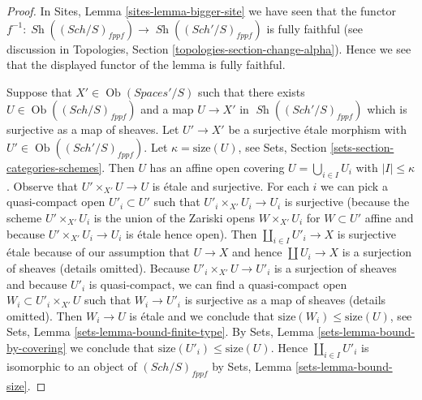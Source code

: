 \documentclass{stacks-project}
\theoremstyle{plain}
\theoremstyle{definition}
\theoremstyle{remark}
\numberwithin{equation}{subsection}
\def\Sch{\mathit{Sch}}
\def\Ob{\mathop{\mathrm{Ob}}\nolimits}
\def\Sh{\mathop{\mathit{Sh}}\nolimits}
\begin{document}
\begin{proof}
In Sites, Lemma \ref{sites-lemma-bigger-site} we have seen that the functor
$f^{-1} : \Sh((\Sch/S)_{fppf}) \to \Sh((\Sch'/S)_{fppf})$
is fully faithful (see discussion in
Topologies, Section \ref{topologies-section-change-alpha}).
Hence we see that the displayed functor of the lemma is fully faithful.

\medskip\noindent
Suppose that $X' \in \Ob(\textit{Spaces}'/S)$ such that there exists
$U \in \Ob((\Sch/S)_{fppf})$ and a map $U \to X'$ in
$\Sh((\Sch'/S)_{fppf})$ which is surjective as a map of sheaves.
Let $U' \to X'$ be a surjective \'etale morphism with
$U' \in \Ob((\Sch'/S)_{fppf})$. Let $\kappa = \text{size}(U)$, see
Sets, Section \ref{sets-section-categories-schemes}.
Then $U$ has an affine open covering $U = \bigcup_{i \in I} U_i$
with $|I| \leq \kappa$. Observe that $U' \times_{X'} U \to U$ is \'etale
and surjective. For each $i$ we can pick a quasi-compact
open $U'_i \subset U'$ such that $U'_i \times_{X'} U_i \to U_i$
is surjective (because the scheme $U' \times_{X'} U_i$ is the
union of the Zariski opens $W \times_{X'} U_i$ for $W \subset U'$
affine and because $U' \times_{X'} U_i \to U_i$ is \'etale hence open).
Then $\coprod_{i \in I} U'_i \to X$ is surjective \'etale
because of our assumption that $U \to X$ and hence $\coprod U_i \to X$
is a surjection of sheaves (details omitted).
Because $U'_i \times_{X'} U \to U'_i$ is a surjection of sheaves
and because $U'_i$ is quasi-compact,
we can find a quasi-compact open $W_i \subset U'_i \times_{X'} U$
such that $W_i \to U'_i$ is surjective as a map of sheaves
(details omitted). Then $W_i \to U$ is \'etale and we conclude
that $\text{size}(W_i) \leq \text{size}(U)$, see
Sets, Lemma \ref{sets-lemma-bound-finite-type}. By
Sets, Lemma \ref{sets-lemma-bound-by-covering} we conclude
that $\text{size}(U'_i) \leq \text{size}(U)$.
Hence $\coprod_{i \in I} U'_i$ is isomorphic to an object of
$(\Sch/S)_{fppf}$ by Sets, Lemma \ref{sets-lemma-bound-size}.


\end{proof}
\end{document}
